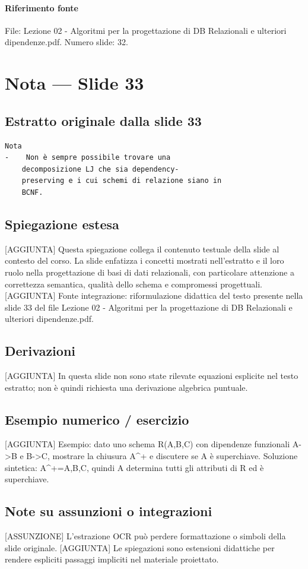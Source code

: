 \documentclass[11pt]{article}
\begin{document}
\paragraph{Riferimento fonte} File: Lezione 02 - Algoritmi per la progettazione di DB Relazionali e ulteriori dipendenze.pdf. Numero slide: 32.
\section{Nota --- Slide 33}
\subsection*{Estratto originale dalla slide 33}
\begin{lstlisting}
Nota
-    Non è sempre possibile trovare una
    decomposizione LJ che sia dependency-
    preserving e i cui schemi di relazione siano in
    BCNF.
\end{lstlisting}
\subsection*{Spiegazione estesa}
[AGGIUNTA] Questa spiegazione collega il contenuto testuale della slide al contesto del corso. La slide enfatizza i concetti mostrati nell'estratto e il loro ruolo nella progettazione di basi di dati relazionali, con particolare attenzione a correttezza semantica, qualità dello schema e compromessi progettuali.
[AGGIUNTA] Fonte integrazione: riformulazione didattica del testo presente nella slide 33 del file Lezione 02 - Algoritmi per la progettazione di DB Relazionali e ulteriori dipendenze.pdf.
\subsection*{Derivazioni}
[AGGIUNTA] In questa slide non sono state rilevate equazioni esplicite nel testo estratto; non è quindi richiesta una derivazione algebrica puntuale.
\subsection*{Esempio numerico / esercizio}
[AGGIUNTA] Esempio: dato uno schema R(A,B,C) con dipendenze funzionali A->B e B->C, mostrare la chiusura A^+ e discutere se A è superchiave. Soluzione sintetica: A^+={A,B,C}, quindi A determina tutti gli attributi di R ed è superchiave.
\subsection*{Note su assunzioni o integrazioni}
[ASSUNZIONE] L'estrazione OCR può perdere formattazione o simboli della slide originale.
[AGGIUNTA] Le spiegazioni sono estensioni didattiche per rendere espliciti passaggi impliciti nel materiale proiettato.
\end{document}
